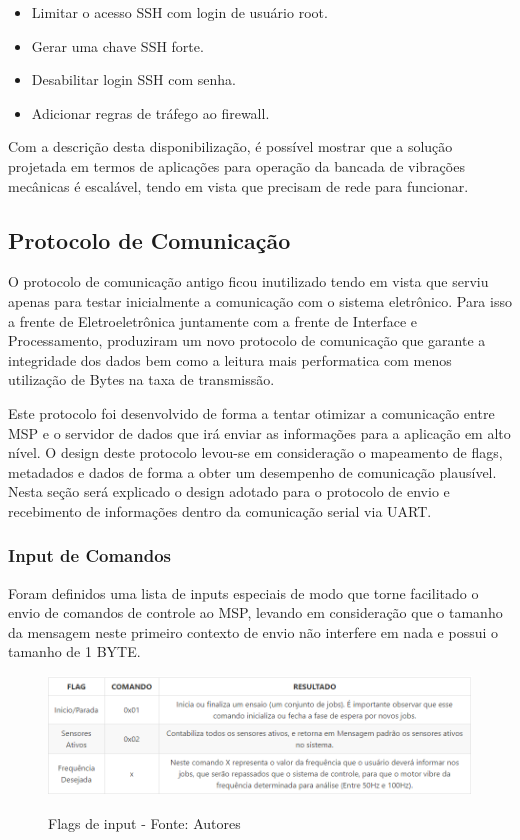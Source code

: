 \begin{itemize}
  \item {Limitar o acesso SSH com login de usuário root}.
  \item {Gerar uma chave SSH forte}.
  \item {Desabilitar login SSH com senha}.
  \item {Adicionar regras de tráfego ao firewall}.
\end{itemize}

Com a descrição desta disponibilização, é possível mostrar que a solução projetada em termos de aplicações para operação da bancada de vibrações mecânicas é escalável, tendo em vista que precisam de rede para funcionar.

\subsection{Protocolo de Comunicação} \label{protocolo_com}

O protocolo de comunicação antigo ficou inutilizado tendo em vista que serviu apenas para testar inicialmente a comunicação com o sistema eletrônico.
Para isso a frente de Eletroeletrônica juntamente com a frente de Interface e Processamento, produziram um novo protocolo de comunicação
que garante a integridade dos dados bem como a leitura mais performatica com menos utilização de Bytes na taxa de transmissão.

Este protocolo foi desenvolvido de forma a tentar otimizar a comunicação entre MSP e o servidor de dados que irá enviar as
informações para a aplicação em alto nível. O design deste protocolo levou-se em consideração o mapeamento de flags,
metadados e dados de forma a obter um desempenho de comunicação plausível.
Nesta seção será explicado o design adotado para o protocolo de envio e recebimento de informações dentro da comunicação serial via UART.

\subsubsection*{Input de Comandos}

Foram definidos uma lista de inputs especiais de modo que torne facilitado o envio de comandos de controle ao MSP, levando em consideração que o tamanho da mensagem neste primeiro contexto de envio não interfere em nada e possui o tamanho de 1 BYTE.

\begin{figure}[H]
\centering
\includegraphics[keepaspectratio=true,scale=0.75]{figuras/flags_input.png}
\label{fig:flags_input}
\caption{Flags de input - Fonte: Autores}
\end{figure}

